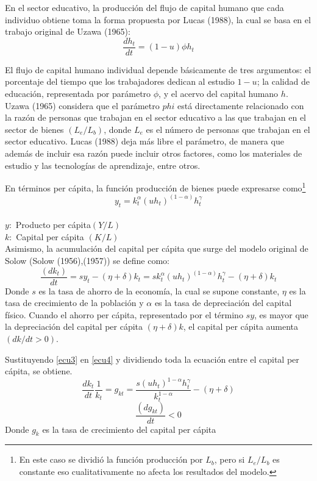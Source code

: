 \documentclass[12pt,a4paper]{report}
\begin{document}
	En el sector educativo, la producción del flujo de capital humano que cada individuo obtiene toma la forma propuesta por Lucas (1988), la cual se basa en el trabajo original de Uzawa (1965): 
	\begin{equation}\label{ecu2}
		\frac{dh_t}{dt}=(1-u)\phi h_t   
	\end{equation}
	
	El flujo de capital humano individual depende básicamente de tres argumentos: el porcentaje del tiempo que los trabajadores dedican al estudio $1-u$; la calidad de educación, representada por parámetro $\phi$, y el acervo del capital humano $h$. Uzawa (1965) considera que el parámetro $phi$ está directamente relacionado con la razón de personas que trabajan en el sector educativo a las que trabajan en el sector de bienes $(L_e/L_b)$, donde $L_e$ es el número de personas que trabajan en el sector educativo. Lucas (1988) deja más libre el parámetro, de manera que además de incluir esa razón puede incluir otros factores, como los materiales de estudio y las tecnologías de aprendizaje, entre otros.
	
	\addtocounter{footnote}{10}
	
	En términos per cápita, la función producción de bienes puede expresarse como\footnote{En este caso se dividió la función producción por $L_b$, pero si $L_e/L_b$ es constante eso cualitativamente no afecta los resultados del modelo.}
	\begin{equation}\label{ecu3}
		y_t=k_t^\alpha(uh_t)^{(1-\alpha)}h_t^\gamma
	\end{equation}\\
	$y:$ Producto per cápita$(Y/L)$\\
	$k:$ Capital per cápita $(K/L)$\\
	Asimismo, la acumulación del capital per cápita que surge del modelo original de Solow (Solow (1956),(1957)) se define como:
	\begin{equation}\label{ecu4}
		\frac{(dk_t)}{dt}=sy_t-(\eta + \delta)k_t=sk_t^\alpha (uh_t)^{(1-\alpha)}h_t^\gamma - (\eta+\delta)k_t
	\end{equation}
	Donde $s$ es la tasa de ahorro de la economía, la cual se supone constante, $\eta$ es la tasa de crecimiento de la población y $\alpha$ es la tasa de depreciación del capital físico. Cuando el ahorro per cápita, representado por el término $sy$, es mayor que la depreciación del capital per cápita $(\eta +\delta )k$, el capital per cápita aumenta $(dk/dt>0)$.
	
	Sustituyendo \ref{ecu3} en \ref{ecu4} y dividiendo toda la ecuación entre el capital per cápita, se obtiene.
	\begin{equation}\label{ecu5}
		\frac{dk_t}{dt}\frac{1}{k_t}=g_{kt}=\frac{s(uh_t)^{1-\alpha}h_t^\gamma}{k_t^{1-\alpha}}-(\eta + \delta)
	\end{equation}
	\begin{equation*}
		\frac{(dg_{kt})}{dt}<0
	\end{equation*}
	Donde $g_{k}$ es la tasa de crecimiento del capital per cápita
	
\end{document}

